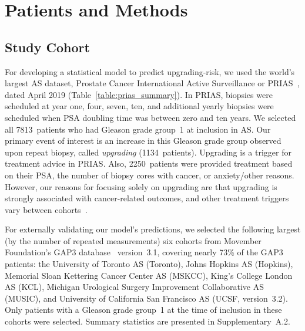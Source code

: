 \section{Patients and Methods}
\subsection{Study Cohort}
\label{subsec:cohort}
For developing a statistical model to predict upgrading-risk, we used the world's largest AS dataset, Prostate Cancer International Active Surveillance or PRIAS~\citep{bul2013active}, dated April 2019 (Table~\ref{table:prias_summary}). In PRIAS, biopsies were scheduled at year one, four, seven, ten, and additional yearly biopsies were scheduled when PSA doubling time was between zero and ten years. We selected all 7813~patients who had Gleason grade group~1 at inclusion in AS. Our primary event of interest is an increase in this Gleason grade group observed upon repeat biopsy, called \textit{upgrading} (1134~patients). Upgrading is a trigger for treatment advice in PRIAS. Also, 2250~patients were provided treatment based on their PSA, the number of biopsy cores with cancer, or anxiety/other reasons. However, our reasons for focusing solely on upgrading are that upgrading is strongly associated with cancer-related outcomes, and other treatment triggers vary between cohorts~\citep{nieboer2018active}.

For externally validating our model's predictions, we selected the following largest (by the number of repeated measurements) six cohorts from Movember Foundation's GAP3 database~\citep{gap3_2018} version~3.1, covering nearly 73\% of the GAP3 patients: the University of Toronto AS (Toronto), Johns Hopkins AS (Hopkins), Memorial Sloan Kettering Cancer Center AS (MSKCC), King's College London AS (KCL), Michigan Urological Surgery Improvement Collaborative AS (MUSIC), and University of California San Francisco AS (UCSF, version~3.2). Only patients with a Gleason grade group~1 at the time of inclusion in these cohorts were selected. Summary statistics are presented in Supplementary~A.2.

